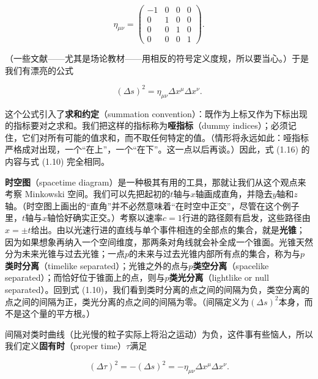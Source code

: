 \begin{equation*}
\eta_{\mu\nu} =
\begin{pmatrix}
-1 & 0 & 0 & 0 \\
0 & 1 & 0 & 0 \\
0 & 0 & 1 & 0 \\
0 & 0 & 0 & 1
\end{pmatrix}.
\tag{1.15}
\end{equation*}

（一些文献——尤其是场论教材——用相反的符号定义度规，所以要当心。）于是我们有漂亮的公式

\begin{equation*}
(\Delta s)^2 = \eta_{\mu\nu}\Delta x^\mu \Delta x^\nu.
\tag{1.16}
\end{equation*}


这个公式引入了\textbf{求和约定}（summation convention）：既作为上标又作为下标出现的指标要对之求和。我们把这样的指标称为\textbf{哑指标}（dummy indices）；必须记住，它们对所有可能的值求和，而不取任何特定的值。（情形将永远如此：哑指标严格成对出现，一个“在上”，一个“在下”。这一点以后再谈。）因此，式 (1.16) 的内容与式 (1.10) 完全相同。

\textbf{时空图}（spacetime diagram）是一种极其有用的工具，那就让我们从这个观点来考察 Minkowski 空间。我们可以先把起初的$t$轴与$x$轴画成直角，并隐去$y$轴和$z$轴。（时空图上画出的“直角”并不必然意味着“在时空中正交”，尽管在这个例子里，$t$轴与$x$轴恰好确实正交。）考察以速率$c=1$行进的路径颇有启发，这些路径由$x=\pm t$给出。由以光速行进的直线与单个事件相连的全部点的集合，就是\textbf{光锥}；因为如果想象再纳入一个空间维度，那两条对角线就会补全成一个锥面。光锥天然分为未来光锥与过去光锥；一点$p$的未来与过去光锥内部所有点的集合，称为与$p$\textbf{类时分离}（timelike separated）；光锥之外的点与$p$\textbf{类空分离}（spacelike separated）；而恰好位于锥面上的点，则与$p$\textbf{类光分离}（lightlike or null separated）。回到式 (1.10)，我们看到类时分离的点之间的间隔为负，类空分离的点之间的间隔为正，类光分离的点之间的间隔为零。（间隔定义为$(\Delta s)^2$本身，而不是这个量的平方根。）

间隔对类时曲线（比光慢的粒子实际上将沿之运动）为负，这件事有些恼人，所以我们定义\textbf{固有时}（proper time）$\tau$满足

\begin{equation*}
(\Delta\tau)^2 = -(\Delta s)^2 = -\eta_{\mu\nu}\Delta x^\mu \Delta x^\nu.
\tag{1.17}
\end{equation*}

